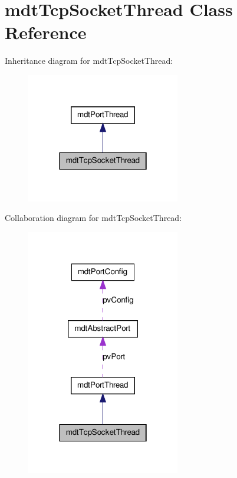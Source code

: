 \hypertarget{classmdt_tcp_socket_thread}{
\section{mdtTcpSocketThread Class Reference}
\label{classmdt_tcp_socket_thread}
}


Inheritance diagram for mdtTcpSocketThread:\nopagebreak
\begin{figure}[H]
\begin{center}
\leavevmode
\includegraphics[width=190pt]{classmdt_tcp_socket_thread__inherit__graph}
\end{center}
\end{figure}


Collaboration diagram for mdtTcpSocketThread:\nopagebreak
\begin{figure}[H]
\begin{center}
\leavevmode
\includegraphics[width=190pt]{classmdt_tcp_socket_thread__coll__graph}
\end{center}
\end{figure}
